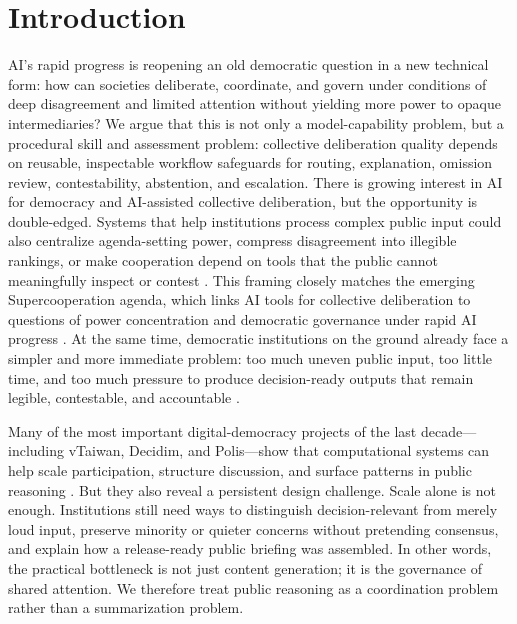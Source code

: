 \documentclass[11pt]{article}
\begin{document}
\vspace{0.25in}

\vspace{0.12in}

\section{Introduction}

AI's rapid progress is reopening an old democratic question in a new technical form: how can societies deliberate, coordinate, and govern under conditions of deep disagreement and limited attention without yielding more power to opaque intermediaries? We argue that this is not only a model-capability problem, but a procedural skill and assessment problem: collective deliberation quality depends on reusable, inspectable workflow safeguards for routing, explanation, omission review, contestability, abstention, and escalation. There is growing interest in AI for democracy and AI-assisted collective deliberation, but the opportunity is double-edged. Systems that help institutions process complex public input could also centralize agenda-setting power, compress disagreement into illegible rankings, or make cooperation depend on tools that the public cannot meaningfully inspect or contest \cite{Dafoe2020OpenProblems,Formosa2024DemocraticCitizenship,Ulnicane2024Governance,Verdegem2022AIcapitalism}. This framing closely matches the emerging Supercooperation agenda, which links AI tools for collective deliberation to questions of power concentration and democratic governance under rapid AI progress \cite{Foresight2026Supercooperation}. At the same time, democratic institutions on the ground already face a simpler and more immediate problem: too much uneven public input, too little time, and too much pressure to produce decision-ready outputs that remain legible, contestable, and accountable \cite{OECD2022Participation}.

\vspace{0.1in}
Many of the most important digital-democracy projects of the last decade---including vTaiwan, Decidim, and Polis---show that computational systems can help scale participation, structure discussion, and surface patterns in public reasoning \cite{Hsiao2018vTaiwan,Aragon2017Decidim,Barandiaran2024Decidim,Small2021Polis}. But they also reveal a persistent design challenge. Scale alone is not enough. Institutions still need ways to distinguish decision-relevant from merely loud input, preserve minority or quieter concerns without pretending consensus, and explain how a release-ready public briefing was assembled. In other words, the practical bottleneck is not just content generation; it is the governance of shared attention. We therefore treat public reasoning as a coordination problem rather than a summarization problem.
\end{document}
